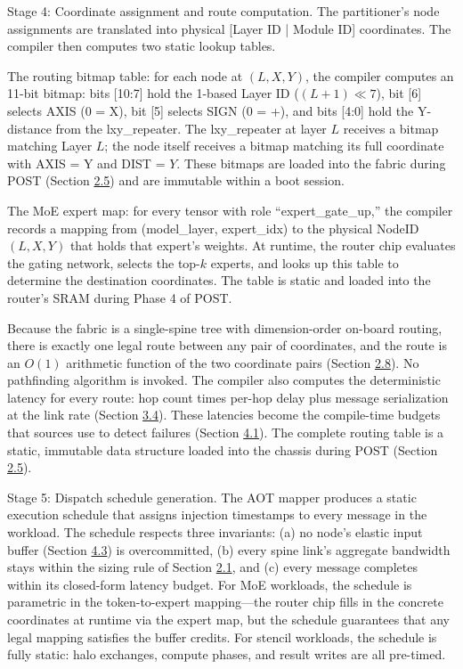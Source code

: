\documentclass[12pt,onecolumn]{article}
\begin{document}
Stage 4: Coordinate assignment and route computation. The partitioner's node assignments are translated into physical [Layer ID | Module ID] coordinates. The compiler then computes two static lookup tables.

The routing bitmap table: for each node at $(L, X, Y)$, the compiler computes an 11-bit bitmap: bits [10:7] hold the 1-based Layer ID ($(L+1) \ll 7$), bit [6] selects AXIS (0 = X), bit [5] selects SIGN (0 = +), and bits [4:0] hold the Y-distance from the lxy\_repeater. The lxy\_repeater at layer $L$ receives a bitmap matching Layer $L$; the node itself receives a bitmap matching its full coordinate with AXIS = Y and DIST = $Y$. These bitmaps are loaded into the fabric during POST (Section \hyperref[sec:2.5]{2.5}) and are immutable within a boot session.

The MoE expert map: for every tensor with role ``expert\_gate\_up,'' the compiler records a mapping from (model\_layer, expert\_idx) to the physical NodeID $(L, X, Y)$ that holds that expert's weights. At runtime, the router chip evaluates the gating network, selects the top-$k$ experts, and looks up this table to determine the destination coordinates. The table is static and loaded into the router's SRAM during Phase 4 of POST.

Because the fabric is a single-spine tree with dimension-order on-board routing, there is exactly one legal route between any pair of coordinates, and the route is an $O(1)$ arithmetic function of the two coordinate pairs (Section \hyperref[sec:2.8]{2.8}). No pathfinding algorithm is invoked. The compiler also computes the deterministic latency for every route: hop count times per-hop delay plus message serialization at the link rate (Section \hyperref[sec:3.4]{3.4}). These latencies become the compile-time budgets that sources use to detect failures (Section \hyperref[sec:4.1]{4.1}). The complete routing table is a static, immutable data structure loaded into the chassis during POST (Section \hyperref[sec:2.5]{2.5}).

Stage 5: Dispatch schedule generation. The AOT mapper produces a static execution schedule that assigns injection timestamps to every message in the workload. The schedule respects three invariants: (a) no node's elastic input buffer (Section \hyperref[sec:4.3]{4.3}) is overcommitted, (b) every spine link's aggregate bandwidth stays within the sizing rule of Section \hyperref[sec:2.1]{2.1}, and (c) every message completes within its closed-form latency budget. For MoE workloads, the schedule is parametric in the token-to-expert mapping---the router chip fills in the concrete coordinates at runtime via the expert map, but the schedule guarantees that any legal mapping satisfies the buffer credits. For stencil workloads, the schedule is fully static: halo exchanges, compute phases, and result writes are all pre-timed.
\end{document}
